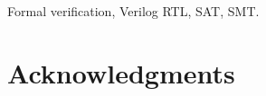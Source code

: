 \documentclass[journal]{IEEEtran}
\theoremstyle{definition}
\begin{document}
\begin{IEEEkeywords}
Formal verification, Verilog RTL, SAT, SMT.
\end{IEEEkeywords}










\section*{Acknowledgments}










\end{document}
